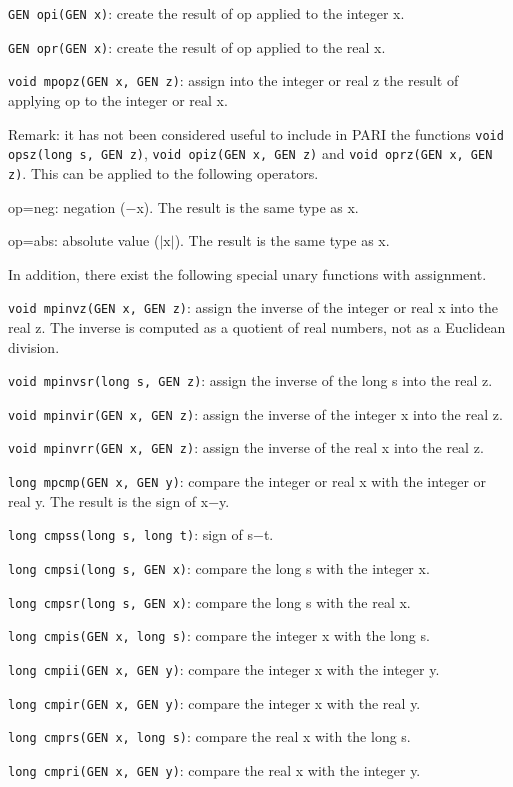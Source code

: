 {\tt GEN opi(GEN x)}: create the result of op applied to the integer x.

{\tt GEN opr(GEN x)}: create the result of op applied to the real x.

{\tt void mpopz(GEN x, GEN z)}: assign into the integer or real z the result
of applying op to the integer or real x.

Remark: it has not been considered useful to include in PARI the functions
{\tt void opsz(long s, GEN z)}, {\tt void opiz(GEN x, GEN z)} and 
{\tt void oprz(GEN x, GEN z)}.
\smallskip
This can be applied to the following operators.

op=neg: negation ($-$x). The result is the same type as x.

op=abs: absolute value ($|\text{x}|$). The result is the same type as x.

In addition, there exist the following special unary functions with assignment.

{\tt void mpinvz(GEN x, GEN z)}: assign the inverse of the integer or real x
into the real z. The inverse is computed as a quotient of real numbers, not as
a Euclidean division.

{\tt void mpinvsr(long s, GEN z)}: assign the inverse of the long s into the
real z.

{\tt void mpinvir(GEN x, GEN z)}: assign the inverse of the integer x into the
real z.

{\tt void mpinvrr(GEN x, GEN z)}: assign the inverse of the real x into the
real z.


{\tt long mpcmp(GEN x, GEN y)}: compare the integer or real x with the integer
or real y. The result is the sign of x$-$y.

{\tt long cmpss(long s, long t)}: sign of s$-$t.

{\tt long cmpsi(long s, GEN x)}: compare the long s with the integer x.

{\tt long cmpsr(long s, GEN x)}: compare the long s with the real x.

{\tt long cmpis(GEN x, long s)}: compare the integer x with the long s.

{\tt long cmpii(GEN x, GEN y)}: compare the integer x with the integer y.

{\tt long cmpir(GEN x, GEN y)}: compare the integer x with the real y.

{\tt long cmprs(GEN x, long s)}: compare the real x with the long s.

{\tt long cmpri(GEN x, GEN y)}: compare the real x with the integer y.

